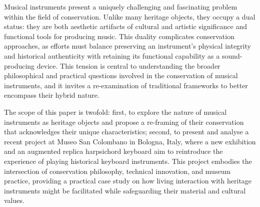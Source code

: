 





Musical instruments present a uniquely challenging and fascinating problem within the field of conservation. Unlike many heritage objects, they occupy a dual status: they are both aesthetic artifacts of cultural and artistic significance and functional tools for producing music. This duality complicates conservation approaches, as efforts must balance preserving an instrument's physical integrity and historical authenticity with retaining its functional capability as a sound-producing device. This tension is central to understanding the broader philosophical and practical questions involved in the conservation of musical instruments, and it invites a re-examination of traditional frameworks to better encompass their hybrid nature.

The scope of this paper is twofold: first, to explore the nature of musical instruments as heritage objects and propose a re-framing of their conservation that acknowledges their unique characteristics; second, to present and analyse a recent project at Museo San Colombano in Bologna, Italy, where a new exhibition and an augmented replica harpsichord keyboard aim to reintroduce the experience of playing historical keyboard instruments. This project embodies the intersection of conservation philosophy, technical innovation, and museum practice, providing a practical case study on how living interaction with heritage instruments might be facilitated while safeguarding their material and cultural values.

